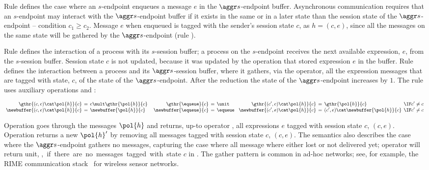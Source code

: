 Rule \Unicast defines the case where an $s$-endpoint enqueues a
message $e$ in the $\aggr s$-endpoint buffer.
Asynchronous communication requires that an $s$-endpoint may
interact with the $\aggr s$-endpoint buffer if it exists in the same or in a
later state than the session state of the $\aggr s$-endpoint -- condition $c_1 \geq c_2$.
%
Message $e$ when enqueued is tagged with the sender's session
state $c$, as $h = (c, e)$, since all the messages on the same
state will be gathered by the $\aggr s$-endpoint (rule \Gather).

Rule \Receive defines the interaction of a process with its $s$-session
buffer; a \Rcv process on the $s$-endpoint receives the next available
expression, $e$, from the $s$-session buffer. Session state $c$ is not updated,
because it was updated by the operation that stored expression $e$ in the buffer.
%
Rule \Gather defines the interaction between a process and its $\aggr s$-session
buffer, where it gathers, via the \mult operator, all the expression messages that
are tagged with state, $c$, of the state of the $\aggr s$-endpoint. After
the reduction the state of the $\aggr s$-endpoint increases by $1$.
%
The rule uses auxiliary operations  and :

\noindent
$
\small
\arraycolsep=2pt
\begin{array}{rclcrclcrclr}
	\gthr{(c, e) \cat \pol{h}}{c} &=& e \mult \gthr{\pol{h}}{c}
	& &
	\gthr{\equeue}{c} &=& \unit
	& &
	\gthr{(c', e) \cat \pol{h}}{c} &=& \gthr{\pol{h}}{c} & \IF c' \not= c
	\\
	\newbuffer{(c, e) \cat \pol{h}}{c} &=& \newbuffer{\pol{h}}{c}
	&\ &
	\newbuffer{\equeue}{c} &=& \equeue
	& &
	\newbuffer{(c', e) \cat \pol{h}}{c} &=& (c', e) \cat \newbuffer{\pol{h}}{c} & \IF c' \not= c
\end{array}
$

\noindent
Operation  goes through the messages $\pol{h}$ and returns,
up-to operator \mult, all expressions $e$ tagged with session state $c$, $(c, e)$.
Operation  returns a new $\pol{h}'$ by removing
all messages tagged with session state $c$, $(c, e)$.
%
The \Gather semantics also describes the case where the $\aggr s$-endpoint
gathers no messages, capturing the case where all message where either lost
or not delivered yet; operator  will
return unit, \unit, if there are no messages tagged with state $c$ in .
%
The gather pattern is common in ad-hoc networks; see, for example, the RIME
communication stack~\cite{Dunkels2007} for wireless sensor networks.

